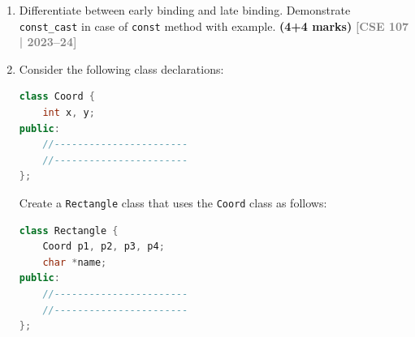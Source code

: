 \documentclass[12pt,a3paper]{article}
\newcommand{\yr}[1]{\hfill\textcolor{gray}{\small\textbf{[#1]}}}
\newcommand{\mk}[1]{\textcolor{orange!70!black}{\small\textbf{(#1 marks)}}}
\begin{document}
\begin{enumerate}
\item Differentiate between early binding and late binding. Demonstrate \texttt{const\_cast} in case of \texttt{const} method with example. \mk{4+4}
\yr{CSE 107 | 2023--24}




\item Consider the following class declarations:

\begin{lstlisting}[language=C++]
class Coord {
    int x, y;
public:
    //-----------------------
    //-----------------------
};
\end{lstlisting}

Create a \texttt{Rectangle} class that uses the \texttt{Coord} class as follows:

\begin{lstlisting}[language=C++]
class Rectangle {
    Coord p1, p2, p3, p4;
    char *name;
public:
    //-----------------------
    //-----------------------
};
\end{lstlisting}


\end{enumerate}
\end{document}
